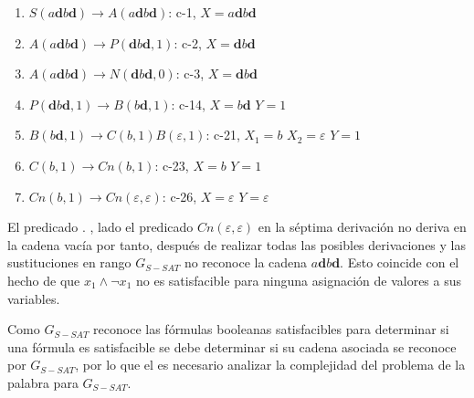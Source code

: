 \documentclass[12pt]{article}
\begin{document}
\begin{enumerate}
    \item $S(a\mathbf{d}b\mathbf{d})\to A(a\mathbf{d}b\mathbf{d})$: c-1, $X=a\mathbf{d}b\mathbf{d}$
    \item $A(a\mathbf{d}b\mathbf{d})\to P(\mathbf{d}b\mathbf{d},1)$: c-2, $X=\mathbf{d}b\mathbf{d}$
    \item $A(a\mathbf{d}b\mathbf{d})\to N(\mathbf{d}b\mathbf{d},0)$: c-3, $X=\mathbf{d}b\mathbf{d}$
    \item $P(\mathbf{d}b\mathbf{d},1) \to B(b\mathbf{d},1)$: c-14, $X=b\mathbf{d}$ $Y=1$
    \item $B(b\mathbf{d},1)\to C(b,1) B(\varepsilon,1)$: c-21, $X_1=b$ $X_2=\varepsilon$ $Y=1$
    \item $C(b,1)\to Cn(b,1)$: c-23, $X=b$ $Y=1$
    \item $Cn(b,1)\to Cn(\varepsilon,\varepsilon)$: c-26, $X=\varepsilon$ $Y=\varepsilon$
\end{enumerate}


El predicado . , lado el predicado $Cn(\varepsilon,\varepsilon)$ en la séptima derivación no deriva en la cadena vacía por tanto, después de realizar todas las posibles derivaciones y las sustituciones en rango $G_{S-SAT}$ no reconoce la cadena $a\mathbf{d}b\mathbf{d}$.  Esto coincide con el hecho de que $x_1 \wedge \neg x_1$ no es satisfacible para ninguna asignación de valores a sus variables.


Como $G_{S-SAT}$ reconoce las fórmulas booleanas satisfacibles para determinar si una fórmula es satisfacible se debe determinar si su cadena asociada se reconoce por $G_{S-SAT}$, por lo que el es necesario analizar la complejidad del problema de la palabra para $G_{S-SAT}$.
\end{document}
